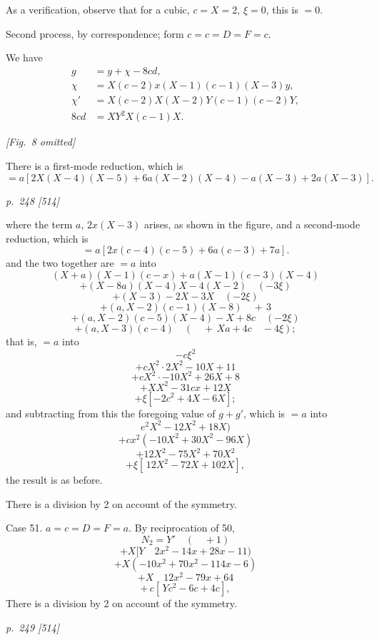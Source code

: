 \documentclass[11pt,a4paper]{book}
\begin{document}
As a verification, observe that for a cubic, $c = X = 2$, $\xi = 0$, this is $= 0$.

Second process, by correspondence; form $c = c = D = F = c$.

We have
\begin{align*}
g &= y + \chi - 8cd, \\
\chi &= X(c - 2)x(X - 1)(c - 1)(X - 3)y, \\
\chi' &= X(c - 2)X(X - 2)Y(c - 1)(c - 2)Y, \\
8cd &= XY^2 X(c - 1)X.
\end{align*}

\begin{center}
\textit{[Fig.~8 omitted]}
\end{center}

There is a first-mode reduction, which is
\[
= a [2X(X - 4)(X - 5) + 6a(X - 2)(X - 4) - a(X - 3) + 2a(X - 3)].
\]

\clearpage

\bigskip
\textit{p.~248 [514]}
\smallskip

\noindent
where the term $a$, $2x(X - 3)$ arises, as shown in the figure, and a second-mode reduction,
which is
\[
= a [2x(c - 4)(c - 5) + 6a(c - 3) + 7a].
\]
and the two together are $= a$ into
\[
(X + a)(X - 1)(c - x) + a(X - 1)(c - 3)(X - 4)
\]
\[
+ (X - 8a)(X - 4)X - 4(X - 2) \quad (-3\xi)
\]
\[
+ (X - 3) - 2X - 3X \quad (-2\xi)
\]
\[
+ (a, X - 2)(c - 1)(X - 8) \quad + \,3
\]
\[
+ (a, X - 2)(c - 5)(X - 4) - X + 8c \quad (-2\xi)
\]
\[
+ (a, X - 3)(c - 4) \quad (\quad + \,Xa + 4c \quad - 4\xi);
\]
that is, $= a$ into
\[
- c\xi^2
\]
\[
+ c X^2 \cdot 2X^2 - 10X + 11
\]
\[
+ c X^2 \cdot -10X^2 + 26X + 8
\]
\[
+ X X^2 - 31cx + 12X
\]
\[
+ \xi [-2c^2 + 4X - 6X];
\]
and subtracting from this the foregoing value of $g + g'$, which is $= a$ into
\[
e^2 X^2 - 12X^2 + 18X)
\]
\[
+ c x^2 (-10X^2 + 30X^2 - 96X)
\]
\[
+ 12X^2 - 75X^2 + 70X^2
\]
\[
+ \xi [\,12X^2 - 72X + 102X],
\]
the result is as before.

There is a division by 2 on account of the symmetry.

Case 51.  $a = c = D = F = a$.  By reciprocation of 50,
\[
N_2 = Y' \quad (\quad +1)
\]
\[
+ X[Y \quad 2x^2 - 14x + 28x - 11)
\]
\[
+ X(-10x^2 + 70x^2 - 114x - 6)
\]
\[
+ X \quad 12x^2 - 79x + 64
\]
\[
+ \,c[\,Yc^2 - 6c + 4c],
\]
There is a division by 2 on account of the symmetry.

\clearpage

\bigskip
\textit{p.~249 [514]}
\smallskip
\end{document}
